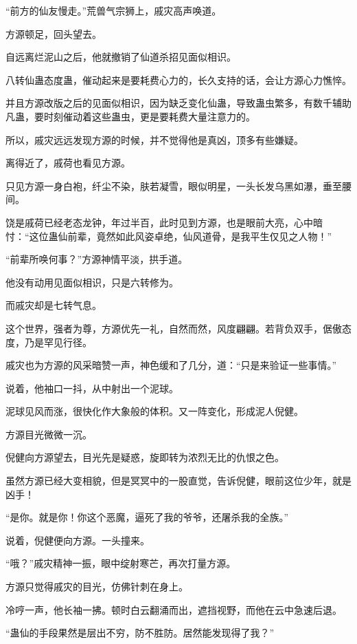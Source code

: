 
\begin{this_body}

“前方的仙友慢走。”荒兽气宗狮上，戚灾高声唤道。

方源顿足，回头望去。

自远离烂泥山之后，他就撤销了仙道杀招见面似相识。

八转仙蛊态度蛊，催动起来是要耗费心力的，长久支持的话，会让方源心力憔悴。

并且方源改版之后的见面似相识，因为缺乏变化仙蛊，导致蛊虫繁多，有数千辅助凡蛊，要时刻催动着这些蛊虫，更是要耗费大量注意力的。

所以，戚灾远远发现方源的时候，并不觉得他是真凶，顶多有些嫌疑。

离得近了，戚荷也看见方源。

只见方源一身白袍，纤尘不染，肤若凝雪，眼似明星，一头长发乌黑如瀑，垂至腰间。

饶是戚荷已经老态龙钟，年过半百，此时见到方源，也是眼前大亮，心中暗忖：“这位蛊仙前辈，竟然如此风姿卓绝，仙风道骨，是我平生仅见之人物！”

“前辈所唤何事？”方源神情平淡，拱手道。

他没有动用见面似相识，只是六转修为。

而戚灾却是七转气息。

这个世界，强者为尊，方源优先一礼，自然而然，风度翩翩。若背负双手，倨傲态度，乃是罕见行径。

戚灾也为方源的风采暗赞一声，神色缓和了几分，道：“只是来验证一些事情。”

说着，他袖口一抖，从中射出一个泥球。

泥球见风而涨，很快化作大象般的体积。又一阵变化，形成泥人倪健。

方源目光微微一沉。

倪健向方源望去，目光先是疑惑，旋即转为浓烈无比的仇恨之色。

虽然方源已经大变相貌，但是冥冥中的一股直觉，告诉倪健，眼前这位少年，就是凶手！

“是你。就是你！你这个恶魔，逼死了我的爷爷，还屠杀我的全族。”

说着，倪健便向方源。一头撞来。

“哦？”戚灾精神一振，眼中绽射寒芒，再次打量方源。

方源只觉得戚灾的目光，仿佛针刺在身上。

冷哼一声，他长袖一拂。顿时白云翻涌而出，遮挡视野，而他在云中急速后退。

“蛊仙的手段果然是层出不穷，防不胜防。居然能发现得了我？”


\end{this_body}
